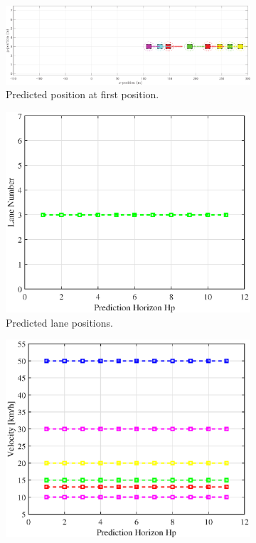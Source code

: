 \begin{figure}[H]
\centering
\begin{subfigure}[t]{\textwidth}
    \includegraphics[width=\textwidth]{Kap6/red_lane/red_lane_traj36.eps}
    \caption{Predicted position at first position.}
    \label{fig:first}
\end{subfigure}
\vspace{1cm}
\begin{subfigure}[b]{0.45\textwidth}
    \includegraphics[width=\textwidth]{Kap6/red_lane/red_lane_lane36.eps}
    \caption{Predicted lane positions.}
    \label{fig:second}
\end{subfigure}
\hfill
\begin{subfigure}[b]{0.45\textwidth}
    \includegraphics[width=\textwidth]{Kap6/red_lane/red_lane_vel36.eps}

\end{subfigure}
\end{figure}

